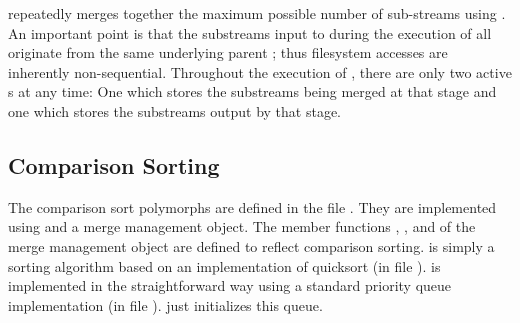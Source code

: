 \tobeextended

 repeatedly merges together the maximum
possible number of sub-streams using . An important point
is that the substreams input to  during the execution of
 all originate from the same underlying
parent ; thus filesystem accesses are inherently
non-sequential. Throughout the execution of
, there are only two active
s at any time: One which stores the substreams being
merged at that stage and one which stores the substreams output by that
stage.


\subsection{Comparison Sorting}
\label{sec:ref-imp-ami-sort}

\tobeextended

The comparison sort polymorphs  are defined in the file
. They are implemented using
 and a merge management object. The member
functions , , and
 of the merge management object are defined to reflect
comparison sorting.  is simply a sorting algorithm
based on an implementation of quicksort (in file
).  is implemented in the straightforward
way using a standard priority queue implementation (in file
).  just initializes this
queue.

